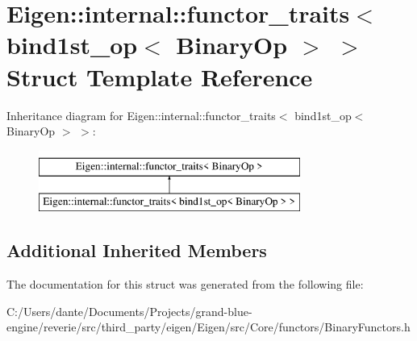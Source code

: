 \hypertarget{struct_eigen_1_1internal_1_1functor__traits_3_01bind1st__op_3_01_binary_op_01_4_01_4}{}\section{Eigen\+::internal\+::functor\+\_\+traits$<$ bind1st\+\_\+op$<$ Binary\+Op $>$ $>$ Struct Template Reference}
\label{struct_eigen_1_1internal_1_1functor__traits_3_01bind1st__op_3_01_binary_op_01_4_01_4}
Inheritance diagram for Eigen\+::internal\+::functor\+\_\+traits$<$ bind1st\+\_\+op$<$ Binary\+Op $>$ $>$\+:\begin{figure}[H]
\begin{center}
\leavevmode
\includegraphics[height=2.000000cm]{struct_eigen_1_1internal_1_1functor__traits_3_01bind1st__op_3_01_binary_op_01_4_01_4}
\end{center}
\end{figure}
\subsection*{Additional Inherited Members}


The documentation for this struct was generated from the following file\+:\begin{DoxyCompactItemize}
\item 
C\+:/\+Users/dante/\+Documents/\+Projects/grand-\/blue-\/engine/reverie/src/third\+\_\+party/eigen/\+Eigen/src/\+Core/functors/Binary\+Functors.\+h\end{DoxyCompactItemize}

